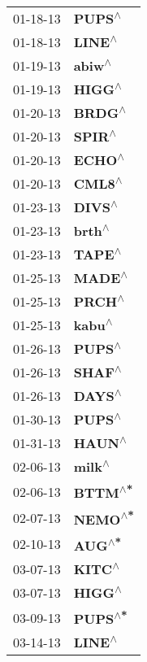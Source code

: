 \begin{supertabular}{p{0.08\textwidth}p{0.2\textwidth}}
 01-18-13 &    \textbf{PUPS\textsuperscript{$\wedge$}} \\
 01-18-13 &    \textbf{LINE\textsuperscript{$\wedge$}} \\
 01-19-13 &    \textbf{abiw\textsuperscript{$\wedge$}} \\
 01-19-13 &    \textbf{HIGG\textsuperscript{$\wedge$}} \\
 01-20-13 &    \textbf{BRDG\textsuperscript{$\wedge$}} \\
 01-20-13 &    \textbf{SPIR\textsuperscript{$\wedge$}} \\
 01-20-13 &    \textbf{ECHO\textsuperscript{$\wedge$}} \\
 01-20-13 &    \textbf{CML8\textsuperscript{$\wedge$}} \\
 01-23-13 &    \textbf{DIVS\textsuperscript{$\wedge$}} \\
 01-23-13 &    \textbf{brth\textsuperscript{$\wedge$}} \\
 01-23-13 &    \textbf{TAPE\textsuperscript{$\wedge$}} \\
 01-25-13 &    \textbf{MADE\textsuperscript{$\wedge$}} \\
 01-25-13 &    \textbf{PRCH\textsuperscript{$\wedge$}} \\
 01-25-13 &    \textbf{kabu\textsuperscript{$\wedge$}} \\
 01-26-13 &    \textbf{PUPS\textsuperscript{$\wedge$}} \\
 01-26-13 &    \textbf{SHAF\textsuperscript{$\wedge$}} \\
 01-26-13 &    \textbf{DAYS\textsuperscript{$\wedge$}} \\
 01-30-13 &    \textbf{PUPS\textsuperscript{$\wedge$}} \\
 01-31-13 &    \textbf{HAUN\textsuperscript{$\wedge$}} \\
 02-06-13 &    \textbf{milk\textsuperscript{$\wedge$}} \\
 02-06-13 &   \textbf{BTTM\textsuperscript{$\wedge$*}} \\
 02-07-13 &   \textbf{NEMO\textsuperscript{$\wedge$*}} \\
 02-10-13 &    \textbf{AUG\textsuperscript{$\wedge$*}} \\
 03-07-13 &    \textbf{KITC\textsuperscript{$\wedge$}} \\
 03-07-13 &    \textbf{HIGG\textsuperscript{$\wedge$}} \\
 03-09-13 &   \textbf{PUPS\textsuperscript{$\wedge$*}} \\
 03-14-13 &    \textbf{LINE\textsuperscript{$\wedge$}} \\

\end{supertabular}

